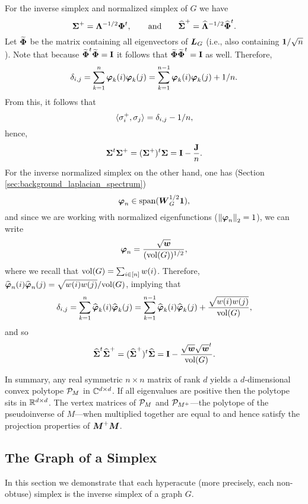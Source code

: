 For the inverse simplex and normalized simplex of $G$ we have 
\[\Sv^+ = \Eval^{-1/2}\Eig^\tp,\qquad \text{and} \qquad \Svn^+ = \Evaln^{-1/2}\Eign^\tp.\]
Let $\widetilde{\Eig}$ be the matrix containing all eigenvectors of $\L_G$ (i.e., also containing $\one/\sqrt{n}$).  Note that because $\wEig^\tp \wEig=\I$ it follows that $\wEig\wEig^\tp=\I$ as well. Therefore, 
\begin{equation*}\delta_{i,j}=\sum_{k=1}^n \vp_k(i)\vp_k(j) = \sum_{k=1}^{n-1} \vp_k(i)\vp_k(j) + 1/n.
\end{equation*}
From this, it follows that 
\[\la\sigma_i^+,\sigma_j\ra = \delta_{i,j} - 1/n,\]
hence, 
\begin{equation}
\label{eq:sv+sv}
    \Sv^\tp\Sv^+=(\Sv^+)^\tp\Sv=\I-\frac{\J}{n}.
\end{equation}
For the inverse normalized simplex on the other hand, one has (Section \ref{sec:background_laplacian_spectrum})
\[\vp_n \in \spn(\W_G^{1/2}\one ),\]
and since we are working with normalized eigenfunctions ($\norm{\vp_n}_2=1$), we can write 
\[\vp_n = \frac{\sqrt{\w}}{(\vol(G))^{1/2}},\]
where we recall that $\vol(G)=\sum_{i\in[n]} w(i)$. 
Therefore, $\vpn_{n}(i)\vpn_{n}(j)=\sqrt{w(i)w(j)}/\vol(G)$, implying that 
\begin{equation*}\delta_{i,j}=\sum_{k=1}^n \vpn_k(i)\vpn_k(j) = \sum_{k=1}^{n-1} \vpn_k(i)\vpn_k(j) + \frac{\sqrt{w(i)w(j)}}{\vol(G)},
\end{equation*}
and so 
\begin{equation}
\label{eq:svn+svn}
\Svn^\tp\Svn^+=(\Svn^+)^\tp\Svn=\I-\frac{\sqrt{\w}\sqrt{\w}^\tp}{\vol(G)}.
\end{equation}

In summary, any real symmetric $n\times n$ matrix of rank $d$ yields a $d$-dimensional convex polytope $\P_M$ in $\C^{d\times d}$. If all eigenvalues are positive then the polytope sits in $\R^{d\times d}$. The vertex matrices of $\P_M$ and $\P_{M^+}$---the polytope of the pseudoinverse of $M$---when multiplied together are equal to and hence satisfy the projection properties of $\M^+\M$. 








\subsection{The Graph of a Simplex}
\label{sec:simplex_to_graph}
In this section we demonstrate that each hyperacute (more precisely, each non-obtuse) simplex is the inverse simplex of a graph $G$. 

